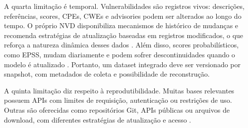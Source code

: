 A quarta limitação é temporal. Vulnerabilidades são registros vivos: descrições, referências, scores, CPEs, CWEs e advisories podem ser alterados ao longo do tempo. O próprio NVD disponibiliza mecanismos de histórico de mudanças e recomenda estratégias de atualização baseadas em registros modificados, o que reforça a natureza dinâmica desses dados \cite{nvd_vulnerability_apis,nvd_data_feeds}. Além disso, scores probabilísticos, como EPSS, mudam diariamente e podem sofrer descontinuidades quando o modelo é atualizado \cite{first_epss_data_stats}. Portanto, um dataset integrado deve ser versionado por snapshot, com metadados de coleta e possibilidade de reconstrução.

A quinta limitação diz respeito à reprodutibilidade. Muitas bases relevantes possuem APIs com limites de requisição, autenticação ou restrições de uso. Outras são oferecidas como repositórios Git, APIs públicas ou arquivos de download, com diferentes estratégias de atualização e acesso \cite{nvd_vulnerability_apis,nvd_data_feeds,github_advisory_database_repo,osv_database,first_epss_data_stats,vulners_api_docs,virustotal_api_v3}.

